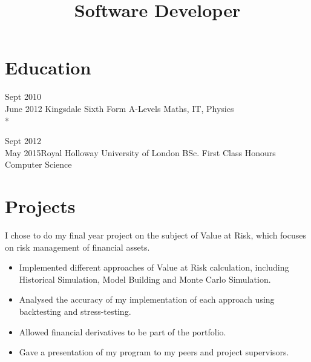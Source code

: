 \documentclass[10pt,a4paper]{moderncv}
\title{Software Developer}
\begin{document}
        \maketitle
    
        \section{Education}
    
        \cventry
        {Sept 2010\\June 2012}
        {Kingsdale Sixth Form}
        {A-Levels}
        {}
        {}
        {Maths, IT, Physics\\*}
    
        \cventry
        {Sept 2012\\May 2015}{Royal Holloway University of London}
        {BSc. First Class Honours}
        {}
        {}
        {Computer Science}
    
        \hfill
        \break
    
        \section{Projects}    
        {
        I chose to do my final year project on the subject of Value at Risk, which focuses on risk management of financial assets.
        \begin{itemize}
            \item Implemented different approaches of Value at Risk calculation, including Historical Simulation, Model Building and Monte Carlo Simulation.
            \item Analysed the accuracy of my implementation of each approach using backtesting and stress-testing.
            \item Allowed financial derivatives to be part of the portfolio.
            \item Gave a presentation of my program to my peers and project supervisors.
        \end{itemize}
        }
    
\end{document}
